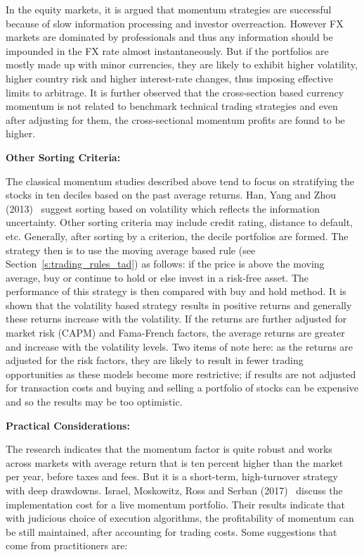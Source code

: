 In the equity markets, it is argued that momentum strategies are successful because of slow information processing and investor overreaction. However FX markets are dominated by professionals and thus any information should be impounded in the FX rate almost instantaneously. But if the portfolios are mostly made up with minor currencies, they are likely to exhibit higher volatility, higher country risk and higher interest-rate changes, thus imposing effective limits to arbitrage. It is further observed that the cross-section based currency momentum is not related to benchmark technical trading strategies and even after adjusting for them, the cross-sectional momentum profits are found to be higher. \twomedskip


\noindent \textbf{Other Sorting Criteria:} \twomedskip

The classical momentum studies described above tend to focus on stratifying the stocks in ten deciles based on the past average returns. Han, Yang and Zhou (2013)~\cite{hanyangzhou} suggest sorting based on volatility which reflects the information uncertainty. Other sorting criteria may include credit rating, distance to default, etc. Generally, after sorting by a criterion, the decile portfolios are formed. The strategy then is to use the moving average based rule (see Section~\ref{s:trading_rules_tad}) as follows: if the price is above the moving average, buy or continue to hold or else invest in a risk-free asset. The performance of this strategy is then compared with buy and hold method. It is shown that the volatility based strategy results in positive returns and generally these returns increase with the volatility. If the returns are further adjusted for market risk (CAPM) and Fama-French factors, the average returns are greater and increase with the volatility levels. Two items of note here: as the returns are adjusted for the risk factors, they are likely to result in fewer trading opportunities as these models become more restrictive; if results are not adjusted for transaction costs and buying and selling a portfolio of stocks can be expensive and so the results may be too optimistic.  \twomedskip


\noindent \textbf{Practical Considerations:} \twomedskip

The research indicates that the momentum factor is quite robust and works across markets with average return that is ten percent higher than the market per year, before taxes and fees. But it is a short-term, high-turnover strategy with deep drawdowns. Israel, Moskowitz, Ross and Serban (2017)~\cite{israel} discuss the implementation cost for a live momentum portfolio. Their results indicate that with judicious choice of execution algorithms, the profitability of momentum can be still maintained, after accounting for trading costs. Some suggestions that come from practitioners are:


